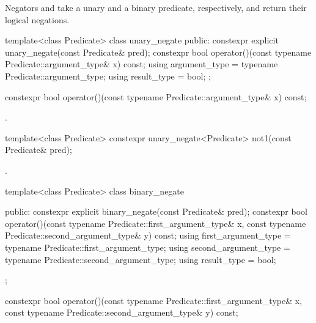 \pnum
Negators  and 
take a unary and a binary predicate, respectively,
and return their logical negations.

%
%
%
\begin{codeblock}
template<class Predicate>
class unary_negate {
public:
  constexpr explicit unary_negate(const Predicate& pred);
  constexpr bool operator()(const typename Predicate::argument_type& x) const;
  using argument_type = typename Predicate::argument_type;
  using result_type   = bool;
};
\end{codeblock}

%
\begin{itemdecl}
constexpr bool operator()(const typename Predicate::argument_type& x) const;
\end{itemdecl}

\begin{itemdescr}
\pnum \returns {}.
\end{itemdescr}

%
\begin{itemdecl}
template<class Predicate>
   constexpr unary_negate<Predicate> not1(const Predicate& pred);
\end{itemdecl}

\begin{itemdescr}
\pnum \returns {}.
\end{itemdescr}

%
%
%
%
\begin{codeblock}
template<class Predicate>
class binary_negate {
public:
  constexpr explicit binary_negate(const Predicate& pred);
  constexpr bool operator()(const typename Predicate::first_argument_type& x,
                            const typename Predicate::second_argument_type& y) const;
  using first_argument_type  = typename Predicate::first_argument_type;
  using second_argument_type = typename Predicate::second_argument_type;
  using result_type          = bool;

};
\end{codeblock}

%
\begin{itemdecl}
constexpr bool operator()(const typename Predicate::first_argument_type& x,
                          const typename Predicate::second_argument_type& y) const;
\end{itemdecl}

